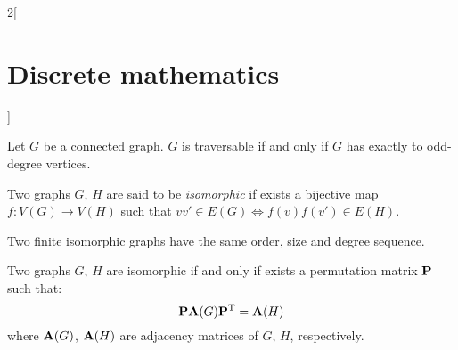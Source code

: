 \documentclass[../../../main.tex]{subfiles}
\begin{document}
\begin{multicols}{2}[\section{Discrete mathematics}]
\begin{definition}
    \end{definition}
    \begin{theorem}
        Let $G$ be a connected graph. $G$ is traversable if and only if $G$ has exactly to odd-degree vertices.
    \end{theorem}
    \begin{definition}
        Two graphs $G$, $H$ are said to be \textit{isomorphic} if exists a bijective map $f:V(G)\rightarrow V(H)$ such that $vv'\in E(G)\iff f(v)f(v')\in E(H)$.
    \end{definition}
    \begin{prop}
        Two finite isomorphic graphs have the same order, size and degree sequence.
    \end{prop}
    \begin{theorem}
        Two graphs $G$, $H$ are isomorphic if and only if exists a permutation matrix $\boldsymbol{\mathrm{P}}$ such that: $$\boldsymbol{\mathrm{P}}\boldsymbol{\mathrm{A}}(G)\vb{P}^{\mathrm{T}}=\boldsymbol{\mathrm{A}}(H)$$ where $\boldsymbol{\mathrm{A}}(G)$, $\boldsymbol{\mathrm{A}}(H)$ are adjacency matrices of $G$, $H$, respectively.
    \end{theorem}

\end{multicols}
\end{document}
